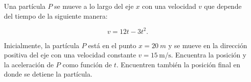 \documentclass[../main.tex]{subfiles}
\begin{document}
\begin{problema}
	Una partícula \(P\) se mueve a lo largo del eje \(x\)
	con una velocidad \(v\) que depende del tiempo
	de la siguiente manera:

	\begin{equation*}
		v = 12t - 3t^{2}.
	\end{equation*}

	Inicialmente, la partícula \(P\) está en el punto
	\(x = \qty{20}{m}\) y se mueve en la dirección positiva
	del eje con una velocidad constante \(v = \qty{15}{\m\per\s}\).
	Encuentra la posición y la aceleración de \(P\) como función
	de \(t\). Encuentren también la posición final en donde se
	detiene la partícula.
\end{problema}
\end{document}
